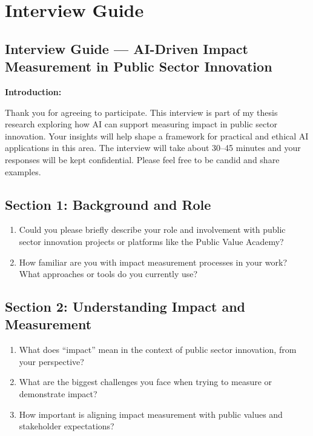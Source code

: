 

\chapter{Interview Guide}

\section*{Interview Guide — AI-Driven Impact Measurement in Public Sector Innovation}

\textbf{Introduction:}

Thank you for agreeing to participate. This interview is part of my thesis research exploring how AI can support measuring impact in public sector innovation. Your insights will help shape a framework for practical and ethical AI applications in this area. The interview will take about 30--45 minutes and your responses will be kept confidential. Please feel free to be candid and share examples.

\vspace{1em}

\section*{Section 1: Background and Role}

\begin{enumerate}
    \item Could you please briefly describe your role and involvement with public sector innovation projects or platforms like the Public Value Academy?
    \item How familiar are you with impact measurement processes in your work? What approaches or tools do you currently use?
\end{enumerate}

\vspace{1em}

\section*{Section 2: Understanding Impact and Measurement}

\begin{enumerate}
    \item What does “impact” mean in the context of public sector innovation, from your perspective?
    \item What are the biggest challenges you face when trying to measure or demonstrate impact?
    \item How important is aligning impact measurement with public values and stakeholder expectations?
\end{enumerate}

